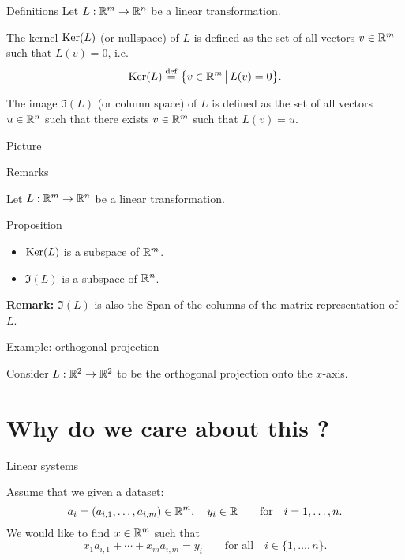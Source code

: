 \documentclass{beamer}
\begin{document}
\begin{frame}[t]{Definitions}
	Let \quad $L: \mathbb{R}^m \to \mathbb{R}^n$ \quad be a linear transformation.
	\begin{definition}[Kernel]
		The kernel ${{\rm Ker}}(L)$ (or nullspace) of $L$ is defined as the set of all vectors $v \in \mathbb{R}^m$ such that $L(v) = 0$, i.e.
		$$
		{{\rm Ker}}(L) \overset{\rm def}{=} \big\{ v \in \mathbb{R}^m \, \big| \, L(v) = 0 \big\}.
		$$
	\end{definition}

	\begin{definition}[Image]
		The image $\Im(L)$ (or column space) of $L$ is defined as the set of all vectors $u \in \mathbb{R}^n$ such that there exists $v \in \mathbb{R}^m$ such that $L(v) = u$. 
	\end{definition}
\end{frame}



\begin{frame}[t]{Picture}
	\grid
\end{frame}

\begin{frame}[t]{Remarks}
	\grid

	Let \quad $L: \mathbb{R}^m \to \mathbb{R}^n$ \quad be a linear transformation.
	\begin{block}{Proposition}
		\begin{itemize}
			\item ${{\rm Ker}}(L)$ is a subspace of $\mathbb{R}^m$.
			\item $\Im(L)$ is a subspace of $\mathbb{R}^n$.
		\end{itemize}
	\end{block}
	\textbf{Remark:} $\Im(L)$ is also the Span of the columns of the matrix representation of $L$.

\end{frame}

\begin{frame}[t]{Example: orthogonal projection}
	\grid

	Consider \quad $L: \mathbb{R}^2 \to \mathbb{R}^2$ \quad to be the orthogonal projection onto the $x$-axis.
\end{frame}


\section{Why do we care about this ?}

\begin{frame}[t]{Linear systems}
	\grid

	Assume that we given a dataset:
	$$
	a_i = (a_{i,1}, \dots, a_{i,m}) \in \mathbb{R}^m, \quad y_i \in \mathbb{R} \qquad \text{for} \quad i = 1, \dots, n.
	$$
	We would like to find $x \in \mathbb{R}^m$ such that
	$$
	x_1 a_{i,1} + \cdots + x_m a_{i,m} = y_i \qquad \text{for all} \quad i \in \{1, \dots, n\}.
	$$
\end{frame}
\end{document}
